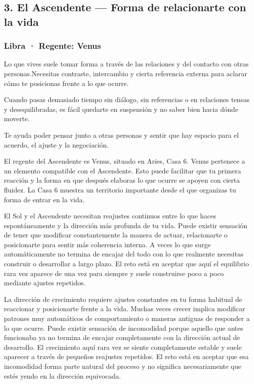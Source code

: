 \documentclass[11pt,a4paper]{article}
\begin{document}
\vspace{0.5cm}


\subsection{3. El Ascendente — Forma de relacionarte con la vida}

\subsubsection*{Libra · Regente: Venus}

Lo que vives suele tomar forma a través de las relaciones y del contacto con otras personas.Necesitas contraste, intercambio y cierta referencia externa para aclarar cómo te posicionas frente a lo que ocurre.

Cuando pasas demasiado tiempo sin diálogo, sin referencias o en relaciones tensas y desequilibradas, es fácil quedarte en suspensión y no saber bien hacia dónde moverte.

Te ayuda poder pensar junto a otras personas y sentir que hay espacio para el acuerdo, el ajuste y la negociación.

El regente del Ascendente es Venus, situado en Aries, Casa 6. Venus pertenece a un elemento compatible con el Ascendente. Esto puede facilitar que tu primera reacción y la forma en que después elaboras lo que ocurre se apoyen con cierta fluidez. La Casa 6 muestra un territorio importante desde el que organizas tu forma de entrar en la vida.

El Sol y el Ascendente necesitan reajustes continuos entre lo que haces espontáneamente y la dirección más profunda de tu vida. Puede existir sensación de tener que modificar constantemente la manera de actuar, relacionarte o posicionarte para sentir más coherencia interna. A veces lo que surge automáticamente no termina de encajar del todo con lo que realmente necesitas construir o desarrollar a largo plazo. El reto está en aceptar que aquí el equilibrio rara vez aparece de una vez para siempre y suele construirse poco a poco mediante ajustes repetidos.

La dirección de crecimiento requiere ajustes constantes en tu forma habitual de reaccionar y posicionarte frente a la vida. Muchas veces crecer implica modificar patrones muy automáticos de comportamiento o maneras antiguas de responder a lo que ocurre. Puede existir sensación de incomodidad porque aquello que antes funcionaba ya no termina de encajar completamente con la dirección actual de desarrollo. El crecimiento aquí rara vez se siente completamente estable y suele aparecer a través de pequeños reajustes repetidos. El reto está en aceptar que esa incomodidad forma parte natural del proceso y no significa necesariamente que estés yendo en la dirección equivocada.
\end{document}
